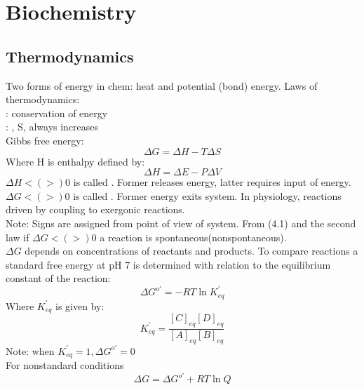 \documentclass[../Bio_chemistryReview.tex]{subfiles}
\begin{document}
\chapter{Biochemistry}

\section{Thermodynamics}

Two forms of energy in chem: heat and potential (bond) energy. Laws of
thermodynamics:\\ 
: conservation of energy\\
: , S, always increases\\
Gibbs free energy:
\begin{equation}
  \boxed{\Delta G = \Delta H - T\Delta S}
\end{equation}
Where H is enthalpy defined by:
\begin{equation}
  \boxed{\Delta H = \Delta E - P\Delta V}
\end{equation}
$ \Delta H <(>) 0 $ is called . Former releases
energy, latter requires input of energy.\\
$ \Delta G <(>) 0 $ is called . Former energy exits
system. In physiology, reactions driven by coupling to exergonic reactions.\\
Note: Signs are assigned from point of view of system.  From (4.1) and the
second law if $ \Delta G <(>) 0$ a reaction is spontaneous(nonspontaneous).\\
$ \Delta G $ depends on concentrations of reactants and products. To compare
reactions a standard free energy at pH 7 is determined with relation to the
equilibrium constant of the reaction: 
\begin{equation}
  \boxed{\Delta G^{o\prime} = -RT\ln K_{eq}^{\prime}}
\end{equation}
Where $ K_{eq}^{\prime} $ is given by:
\begin{equation}
  K_{eq}^{\prime} = \dfrac{[C]_{eq}[D]_{eq}}{[A]_{eq}[B]_{eq}}
\end{equation}
Note: when $ K_{eq}^{\prime} = 1, \Delta G^{o'} = 0$\\
For nonstandard conditions\\
\begin{equation}
  \boxed{\Delta G = \Delta G^{o\prime} + RT \ln Q}
\end{equation}
\end{document}
